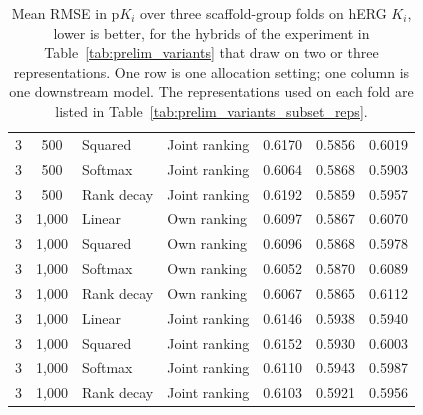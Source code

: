 \begin{table}[htbp]
\begin{tabular}{@{}ccllccc@{}}
3 & 500 & Squared & Joint ranking & 0.6170 & 0.5856 & 0.6019 \\
3 & 500 & Softmax & Joint ranking & 0.6064 & 0.5868 & 0.5903 \\
3 & 500 & Rank decay & Joint ranking & 0.6192 & 0.5859 & 0.5957 \\
3 & 1,000 & Linear & Own ranking & 0.6097 & 0.5867 & 0.6070 \\
3 & 1,000 & Squared & Own ranking & 0.6096 & 0.5868 & 0.5978 \\
3 & 1,000 & Softmax & Own ranking & 0.6052 & 0.5870 & 0.6089 \\
3 & 1,000 & Rank decay & Own ranking & 0.6067 & 0.5865 & 0.6112 \\
3 & 1,000 & Linear & Joint ranking & 0.6146 & 0.5938 & 0.5940 \\
3 & 1,000 & Squared & Joint ranking & 0.6152 & 0.5930 & 0.6003 \\
3 & 1,000 & Softmax & Joint ranking & 0.6110 & 0.5943 & 0.5987 \\
3 & 1,000 & Rank decay & Joint ranking & 0.6103 & 0.5921 & 0.5956 \\
\bottomrule
\end{tabular}
\caption[Allocation settings over two or three representations on hERG $K_i$.]{Mean RMSE in p$K_i$ over three scaffold-group folds on hERG $K_i$, lower is better, for the hybrids of the experiment in Table~\ref{tab:prelim_variants} that draw on two or three representations. One row is one allocation setting; one column is one downstream model. The representations used on each fold are listed in Table~\ref{tab:prelim_variants_subset_reps}.}
\label{tab:prelim_variants_subsets}
\end{table}

